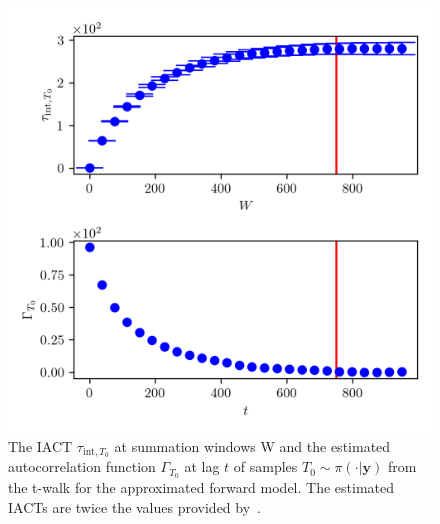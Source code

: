 \begin{figure}[ht!]
	\centering
	\includegraphics{UwerrTauIntTWalk4.png}
	\caption[IACT and autocorrelation function of samples $T_0  \sim \pi(\cdot|\bm{y})$, for approximated model.]{The IACT $\tau_{\text{int},T_0}$ at summation windows W and the estimated autocorrelation function $\Gamma_{T_0}$ at lag $t$ of samples $T_0 \sim \pi( \cdot| \bm{y})$ from the t-walk for the approximated forward model.
	The estimated IACTs are twice the values provided by~\cite{drikHesse, UwerrM}.}
	\label{fig:TWalkIATC5}
\end{figure}


